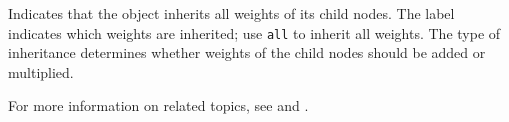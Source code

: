 
Indicates that the object inherits all weights of its child nodes. The
label indicates which weights are inherited; use {\tt all} to inherit
all weights. The type of inheritance determines whether weights of the
child nodes should be added or multiplied. 

For more information on related topics, see 
and .



